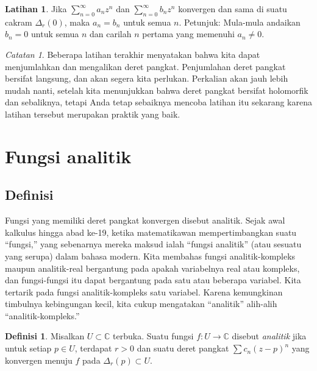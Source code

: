 \documentclass[12pt,openany]{book}
\newcommand{\C}{{\mathbb{C}}}
\newcommand{\myindex}[1]{#1\index{#1}}
\newcommand{\myquote}[1]{``#1''}
\theoremstyle{plain}
\theoremstyle{remark}
\newtheorem{remark}[thm]{Catatan}
\theoremstyle{definition}
\newtheorem{defn}[thm]{Definisi}
\newenvironment{exbox}{%
    \def\FrameCommand{\vrule width 1pt \relax\hspace{10pt}}%
    \MakeFramed{\advance\hsize-\width\FrameRestore}%
}{%
    \endMakeFramed
}
\theoremstyle{exercise}
\newtheorem{exercise}{Latihan}[section]
\theoremstyle{example}
\begin{document}
\begin{exbox}
\begin{exercise}
Jika $\sum_{n=0}^\infty a_n z^{n}$ dan $\sum_{n=0}^\infty b_n z^{n}$
konvergen dan sama di suatu cakram $\Delta_r(0)$, maka $a_n = b_n$
untuk semua $n$.  Petunjuk: Mula-mula andaikan $b_n = 0$ untuk semua $n$
dan carilah $n$ pertama yang memenuhi $a_n \neq 0$.
\end{exercise}
\end{exbox}

\begin{remark}
Beberapa latihan terakhir menyatakan bahwa kita dapat menjumlahkan dan mengalikan deret pangkat.
Penjumlahan deret pangkat bersifat langsung, dan akan segera kita perlukan.
Perkalian akan jauh lebih mudah nanti, setelah
kita menunjukkan bahwa deret pangkat bersifat
holomorfik dan sebaliknya, tetapi Anda tetap sebaiknya mencoba latihan itu sekarang karena latihan tersebut
merupakan praktik yang baik.
\end{remark}


\section{Fungsi analitik}
\label{sec:analfuncs}

\subsection{Definisi}

Fungsi yang memiliki deret pangkat konvergen disebut analitik.
Sejak awal kalkulus hingga abad ke-19,
ketika matematikawan mempertimbangkan suatu \myquote{fungsi,} yang sebenarnya mereka maksud ialah
\myquote{fungsi analitik} (atau sesuatu yang serupa) dalam bahasa modern.
Kita membahas
fungsi analitik-kompleks maupun analitik-real bergantung pada apakah
variabelnya real atau kompleks, dan fungsi-fungsi itu dapat bergantung pada satu atau beberapa variabel.
Kita tertarik pada fungsi analitik-kompleks satu variabel.
Karena kemungkinan timbulnya kebingungan kecil, kita cukup mengatakan \myquote{analitik} alih-alih
\myquote{analitik-kompleks.}

\begin{defn}
Misalkan $U \subset \C$ terbuka.  Suatu fungsi $f \colon U \to \C$
disebut \emph{\myindex{analitik}}
jika untuk setiap $p \in U$, terdapat
$r > 0$ dan suatu
deret pangkat $\sum c_n {(z-p)}^n$ yang konvergen menuju $f$ pada $\Delta_r(p) \subset
U$.
\end{defn}
\end{document}
